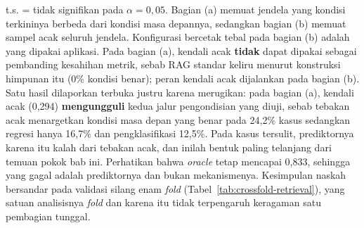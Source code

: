\begin{table}[htbp]
\vspace{0.4em}
{\tabnotestyle t.s. = tidak signifikan pada $\alpha=0{,}05$. Bagian (a) memuat jendela yang kondisi terkininya berbeda dari kondisi masa depannya, sedangkan bagian (b) memuat sampel acak seluruh jendela. Konfigurasi bercetak tebal pada bagian (b) adalah yang dipakai aplikasi. Pada bagian (a), kendali acak \textbf{tidak} dapat dipakai sebagai pembanding kesahihan metrik, sebab RAG standar keliru menurut konstruksi himpunan itu (0\% kondisi benar); peran kendali acak dijalankan pada bagian (b). Satu hasil dilaporkan terbuka justru karena merugikan: pada bagian (a), kendali acak (0,294) \textbf{mengungguli} kedua jalur pengondisian yang diuji, sebab tebakan acak menargetkan kondisi masa depan yang benar pada 24,2\% kasus sedangkan regresi hanya 16,7\% dan pengklasifikasi 12,5\%. Pada kasus tersulit, prediktornya karena itu kalah dari tebakan acak, dan inilah bentuk paling telanjang dari temuan pokok bab ini. Perhatikan bahwa \emph{oracle} tetap mencapai 0,833, sehingga yang gagal adalah prediktornya dan bukan mekanismenya. Kesimpulan naskah bersandar pada validasi silang enam \emph{fold} (Tabel~\ref{tab:crossfold-retrieval}), yang satuan analisisnya \emph{fold} dan karena itu tidak terpengaruh keragaman satu pembagian tunggal.\par}
\end{table}
